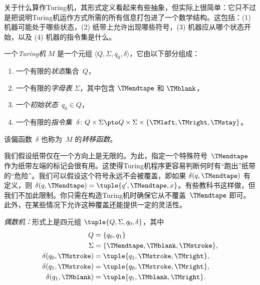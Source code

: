 \documentclass[../../../include/open-logic-section]{subfiles}
\begin{document}

\begin{explain}
关于什么算作Turing机，其形式定义看起来有些抽象，但实际上很简单：它只不过是把说明Turing机运作方式所需的所有信息打包进了一个数学结构。这包括：(1) 机器可能处于哪些状态，(2) 纸带上允许出现哪些符号，(3) 机器应从哪个状态开始，以及 (4) 机器的指令集是什么。
\end{explain}

\begin{defn}[Turing机]
一个\emph{Turing机} $M$ 是一个元组 $\langle Q, \Sigma, q_0,
\delta\rangle$，它由以下部分组成：
\begin{enumerate}
\item 一个有限的\emph{状态}集合~$Q$，
\item 一个有限的\emph{字母表} $\Sigma$，其中包含 $\TMendtape$ 和 $\TMblank$，
\item 一个\emph{初始状态}~$q_0 \in Q$，
\item 一个有限的\emph{指令集}~$\delta\colon Q \times \Sigma
  \pto Q \times \Sigma \times \{\TMleft, \TMright, \TMstay\}$。
\end{enumerate}
该偏函数~$\delta$ 也称为~$M$ 的\emph{转移函数}。
\end{defn}

\begin{explain}
我们假设纸带仅在一个方向上是无限的。为此，指定一个特殊符号~$\TMendtape$ 作为纸带左端的标记会很有用。这使得Turing机程序更容易判断何时有“跑出”纸带的“危险”。我们可以假设这个符号永远不会被覆盖，即如果 $\delta(q,\TMendtape)$ 有定义，则 $\delta(q,\TMendtape) = \tuple{q', \TMendtape, x}$。有些教科书这样做，但我们不加此限制。你只需在构造Turing机时确保它从不覆盖~$\TMendtape$ 即可。此外，在某些情况下允许这种覆盖还能提供一定的灵活性。
\end{explain}

\begin{ex}
\emph{偶数机：}形式上是四元组 $\tuple{Q, \Sigma, q_0, \delta}$，其中
\begin{align*}
Q & = \{ q_0, q_1 \} \\
\Sigma & = \{ \TMendtape, \TMblank, \TMstroke \}, \\
\delta(q_0, \TMstroke) & = \tuple{q_1, \TMstroke, \TMright},\\
\delta(q_1, \TMstroke) & = \tuple{q_0, \TMstroke, \TMright},\\
\delta(q_1, \TMblank)  & = \tuple{q_1, \TMblank, \TMright}.
\end{align*}
\end{ex}
\end{document}
